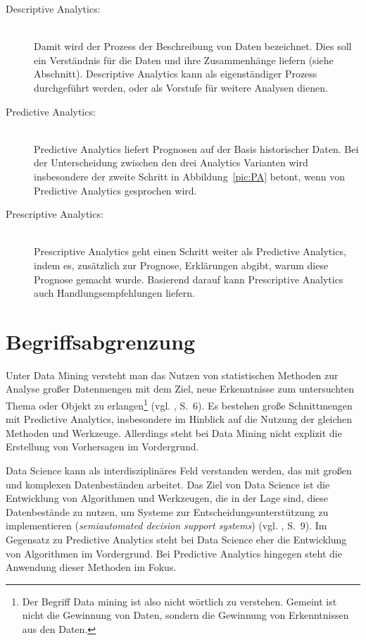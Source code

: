 \begin{description}

\item[Descriptive Analytics:] \hfill \\
Damit wird der Prozess der Beschreibung von Daten bezeichnet. Dies soll ein
Verständnis für die Daten und ihre Zusammenhänge liefern (siehe Abschnitt\xcom).
Descriptive Analytics kann als eigenständiger Prozess durchgeführt werden, oder
als Vorstufe für weitere Analysen dienen.

\item[Predictive Analytics:] \hfill \\
Predictive Analytics liefert Prognosen auf der Basis historischer Daten. Bei der
Unterscheidung zwischen den drei Analytics Varianten wird insbesondere der
zweite Schritt in Abbildung~\ref{pic:PA} betont, wenn von Predictive Analytics
gesprochen wird.

\item[Prescriptive Analytics:] \hfill \\
Prescriptive Analytics geht einen Schritt weiter als Predictive Analytics, indem
es, zusätzlich zur Prognose, Erklärungen abgibt, warum diese Prognose gemacht wurde.
Basierend darauf kann Prescriptive Analytics auch Handlungsempfehlungen liefern.

\end{description}

\section{Begriffsabgrenzung}

Unter Data Mining versteht man das Nutzen von statistischen Methoden zur
Analyse großer Datenmengen mit dem Ziel, neue Erkenntnisse zum untersuchten 
Thema oder Objekt zu erlangen\footnote{
Der Begriff Data mining ist also nicht wörtlich zu verstehen. Gemeint ist
nicht die Gewinnung von Daten, sondern die Gewinnung von Erkenntnissen aus den
Daten.
}
(vgl. \cite{McCarthy}, S.~6). Es bestehen große Schnittmengen mit
Predictive Analytics, insbesondere im Hinblick auf die Nutzung der
gleichen Methoden und Werkzeuge. Allerdings steht bei Data Mining nicht
explizit die Erstellung von Vorhersagen im Vordergrund.

Data Science kann als interdisziplinäres Feld verstanden werden, das mit
großen und komplexen Datenbeständen arbeitet. Das Ziel von Data Science
ist die Entwicklung von Algorithmen und Werkzeugen, die in der Lage sind, diese
Datenbestände zu nutzen, um Systeme zur Entscheidungsunterstützung zu
implementieren (\emph{semiautomated decision support systems}) (vgl.
\cite{Dinov}, S.~9).  Im Gegensatz zu Predictive Analytics steht bei 
Data Science eher die Entwicklung von Algorithmen im Vordergrund. 
Bei Predictive Analytics hingegen steht die Anwendung dieser Methoden im 
Fokus.

